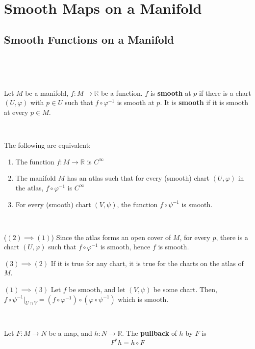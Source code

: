\documentclass{article}
\begin{document}
\section{Smooth Maps on a Manifold}

\subsection{Smooth Functions on a Manifold}
\

\begin{definition}
  \

  Let $M$ be a manifold, $f: M \to \mathbb{R}$ be a function. $f$ is \textbf{smooth} at $p$ if there is a chart $(U, \varphi)$ with $p \in U$ such that $f \circ \varphi ^{-1}$ is smooth at $p$. It is \textbf{smooth} if it is smooth at every $p \in M$.
\end{definition}

\begin{proposition}
  \

  The following are equivalent:

  \begin{enumerate}
    \item The function $f: M \to \mathbb{R}$ is $C^\infty$
    \item The manifold $M$ has an atlas such that for every (smooth) chart $(U, \varphi)$ in the atlas, $f \circ \varphi ^{-1}$ is $C^\infty$
    \item For every (smooth) chart $(V, \psi)$, the function $f \circ \psi ^{-1}$ is smooth.
  \end{enumerate}
\end{proposition}

\begin{customproof}
  \

  ($(2) \implies (1)$) Since the atlas forms an open cover of $M$, for every $p$, there is a chart $(U, \varphi)$ such that $f \circ \varphi ^{-1}$ is smooth, hence $f$ is smooth.

  $(3) \implies (2)$ If it is true for any chart, it is true for the charts on the atlas of $M$.

  $(1) \implies (3)$ Let $f$ be smooth, and let $(V,\psi)$ be some chart. Then, $f \circ \psi ^{-1} \vert_{U \cap V} = (f \circ \varphi ^{-1}) \circ (\varphi \circ\psi ^{-1})$ which is smooth.
\end{customproof}

\begin{definition}[Pullback]
  \

  Let $F: M \to N$ be a map, and $h: N \to \mathbb{R}$. The \textbf{pullback} of $h$ by $F$ is $$F^*h = h \circ F$$
\end{definition}
\end{document}

